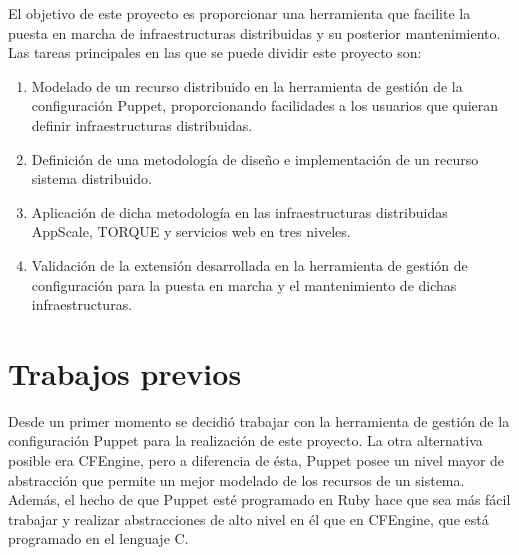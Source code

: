 El objetivo de este proyecto es proporcionar una herramienta que facilite la puesta en marcha de infraestructuras distribuidas y su posterior mantenimiento. Las tareas principales en las que se puede dividir este proyecto son:

\begin{enumerate}
\item Modelado de un recurso distribuido en la herramienta de gestión de la configuración Puppet, proporcionando facilidades a los usuarios que quieran definir infraestructuras distribuidas.
\item Definición de una metodología de diseño e implementación de un recurso sistema distribuido.
\item Aplicación de dicha metodología en las infraestructuras distribuidas AppScale, TORQUE y servicios web en tres niveles.
\item Validación de la extensión desarrollada en la herramienta de gestión de configuración para la puesta en marcha y el mantenimiento de dichas infraestructuras.
\end{enumerate}


\section{Trabajos previos}

Desde un primer momento se decidió trabajar con la herramienta de gestión de la configuración Puppet para la realización de este proyecto. La otra alternativa posible era CFEngine, pero a diferencia de ésta, Puppet posee un nivel mayor de abstracción que permite un mejor modelado de los recursos de un sistema. Además, el hecho de que Puppet esté programado en Ruby hace que sea más fácil trabajar y realizar abstracciones de alto nivel en él que en CFEngine, que está programado en el lenguaje C.

